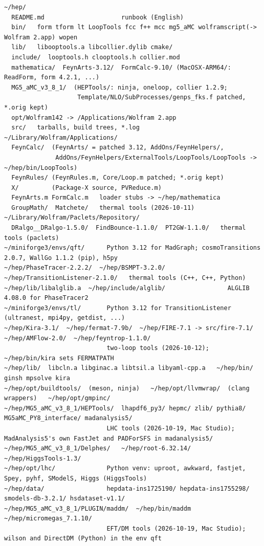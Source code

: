 \documentclass[a4paper,10pt]{ltjsarticle}
\begin{document}
\begin{Verbatim}
~/hep/
  README.md                     runbook (English)
  bin/   form tform lt LoopTools fcc f++ mcc mg5_aMC wolframscript(-> Wolfram 2.app) wopen
  lib/   libooptools.a libcollier.dylib cmake/
  include/  looptools.h clooptools.h collier.mod
  mathematica/  FeynArts-3.12/  FormCalc-9.10/ (MacOSX-ARM64/: ReadForm, form 4.2.1, ...)
  MG5_aMC_v3_8_1/  (HEPTools/: ninja, oneloop, collier 1.2.9;
                    Template/NLO/SubProcesses/genps_fks.f patched, *.orig kept)
  opt/Wolfram142 -> /Applications/Wolfram 2.app
  src/   tarballs, build trees, *.log
~/Library/Wolfram/Applications/
  FeynCalc/  (FeynArts/ = patched 3.12, AddOns/FeynHelpers/,
              AddOns/FeynHelpers/ExternalTools/LoopTools/LoopTools -> ~/hep/bin/LoopTools)
  FeynRules/ (FeynRules.m, Core/Loop.m patched; *.orig kept)
  X/         (Package-X source, PVReduce.m)
  FeynArts.m FormCalc.m   loader stubs -> ~/hep/mathematica
  GroupMath/  Matchete/   thermal tools (2026-10-11)
~/Library/Wolfram/Paclets/Repository/
  DRalgo__DRalgo-1.5.0/  FindBounce-1.1.0/  PT2GW-1.1.0/   thermal tools (paclets)
~/miniforge3/envs/qft/      Python 3.12 for MadGraph; cosmoTransitions 2.0.7, WallGo 1.1.2 (pip), h5py
~/hep/PhaseTracer-2.2.2/  ~/hep/BSMPT-3.2.0/  ~/hep/TransitionListener-2.1.0/   thermal tools (C++, C++, Python)
~/hep/lib/libalglib.a  ~/hep/include/alglib/                 ALGLIB 4.08.0 for PhaseTracer2
~/miniforge3/envs/tl/       Python 3.12 for TransitionListener (ultranest, mpi4py, getdist, ...)
~/hep/Kira-3.1/  ~/hep/fermat-7.9b/  ~/hep/FIRE-7.1 -> src/fire-7.1/  ~/hep/AMFlow-2.0/  ~/hep/feyntrop-1.1.0/
                            two-loop tools (2026-10-12); ~/hep/bin/kira sets FERMATPATH
~/hep/lib/  libcln.a libginac.a libtsil.a libyaml-cpp.a   ~/hep/bin/  ginsh mpsolve kira
~/hep/opt/buildtools/  (meson, ninja)   ~/hep/opt/llvmwrap/  (clang wrappers)   ~/hep/opt/gmpinc/
~/hep/MG5_aMC_v3_8_1/HEPTools/  lhapdf6_py3/ hepmc/ zlib/ pythia8/ MG5aMC_PY8_interface/ madanalysis5/
                            LHC tools (2026-10-19, Mac Studio); MadAnalysis5's own FastJet and PADForSFS in madanalysis5/
~/hep/MG5_aMC_v3_8_1/Delphes/   ~/hep/root-6.32.14/   ~/hep/HiggsTools-1.3/
~/hep/opt/lhc/              Python venv: uproot, awkward, fastjet, Spey, pyhf, SModelS, Higgs (HiggsTools)
~/hep/data/                 hepdata-ins1725190/ hepdata-ins1755298/ smodels-db-3.2.1/ hsdataset-v1.1/
~/hep/MG5_aMC_v3_8_1/PLUGIN/maddm/  ~/hep/bin/maddm  ~/hep/micromegas_7.1.10/
                            EFT/DM tools (2026-10-19, Mac Studio); wilson and DirectDM (Python) in the env qft

\end{Verbatim}
\end{document}
